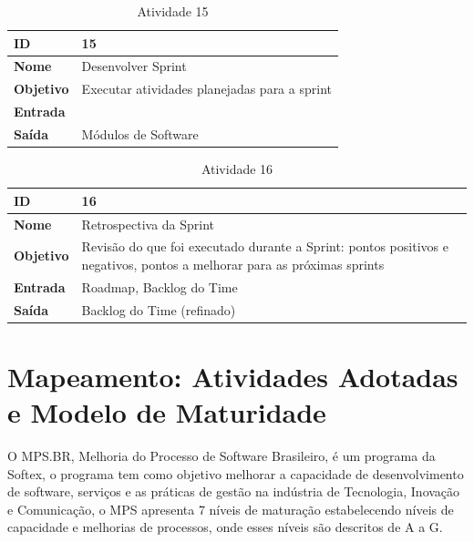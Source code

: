 \begin{table}[!h]
	\centering
	\caption{Atividade 15}
	\label{my-label}
	\begin{tabular}{|l|l|}
	\hline
	\textbf{ID}       & 15                                           \\ \hline
	\textbf{Nome}     & Desenvolver Sprint                           \\ \hline
	\textbf{Objetivo} & Executar atividades planejadas para a sprint \\ \hline
	\textbf{Entrada}  &                                              \\ \hline
	\textbf{Saída}    & Módulos de Software                          \\ \hline
	\end{tabular}
\end{table}

\begin{table}[!h]
	\centering
	\caption{Atividade 16}
	\label{my-label}
	\begin{tabular}{|l|l|}
	\hline
	\textbf{ID}       & 16                                                                                                                      \\ \hline
	\textbf{Nome}     & Retrospectiva da Sprint                                                                                                 \\ \hline
	\textbf{Objetivo} &\parbox[t]{7cm}{Revisão do que foi executado durante a Sprint: pontos positivos e negativos, pontos a melhorar para as próximas sprints} \\ \hline
	\textbf{Entrada}  & Roadmap, Backlog do Time                                                                                                \\ \hline
	\textbf{Saída}    & Backlog do Time (refinado)                                                                                              \\ \hline
	\end{tabular}
\end{table}


\section{Mapeamento: Atividades Adotadas e Modelo de Maturidade}
O MPS.BR, Melhoria do Processo de Software Brasileiro, é um programa da Softex, o programa tem como objetivo melhorar a
capacidade de desenvolvimento de software, serviços e as práticas de gestão na indústria de Tecnologia, Inovação e Comunicação,
 o MPS apresenta 7 níveis de maturação estabelecendo níveis de capacidade e melhorias de processos, onde esses níveis são
 descritos de A a G.

